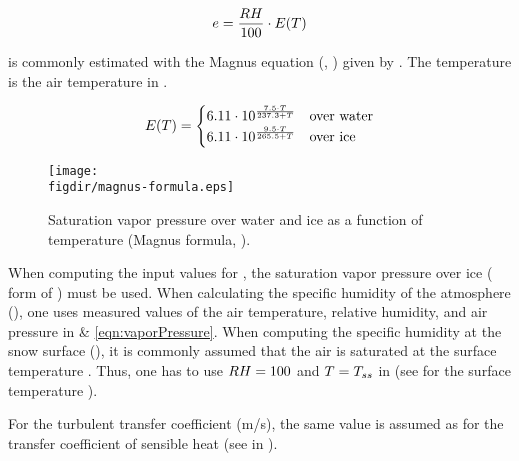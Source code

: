 \begin{equation} \label{eqn:vaporPressure}
  e = \frac{RH}{100} \cdot E(T)
\end{equation}

\satVaporPressure{} is commonly estimated with the Magnus equation (, ) given by \citet{Dyck1995}. The temperature \temperature{} is the air temperature in \celsius.

\begin{equation} \label{eqn:Magnus}
  E(T) =
  \begin{cases}
    6.11 \cdot 10^{\frac{7.5 \cdot T}{237.3 + T}} & \text{over water} \\
    6.11 \cdot 10^{\frac{9.5 \cdot T}{265.5 + T}} & \text{over ice} \\
  \end{cases}
\end{equation}

\begin{figure}[htb]
  \centering
  \texttt{[image: \\figdir/magnus-formula.eps]}
  \caption[Saturation vapor pressure over water and ice as a function of temperature.]{Saturation vapor pressure over water and ice as a function of temperature (Magnus formula, ). \label{fig:Magnus}}
\end{figure}

When computing the input values for , the saturation vapor pressure over ice (\second{} form of ) must be used. When calculating the specific humidity of the atmosphere (\specHumidity), one uses measured values of the air temperature, relative humidity, and air pressure in  \& \ref{eqn:vaporPressure}. When computing the specific humidity at the snow surface (\specHumiditySurface), it is commonly assumed that the air is saturated at the surface temperature \citep{Tarboton1996}. Thus, one has to use $RH=100$ and $T=T_{ss}$ in  (see  for the surface temperature \snowSurfaceTemperature).

For the turbulent transfer coefficient \turbTransCoeff{} (m/s), the same value is assumed as for the transfer coefficient of sensible heat (see  in ).


